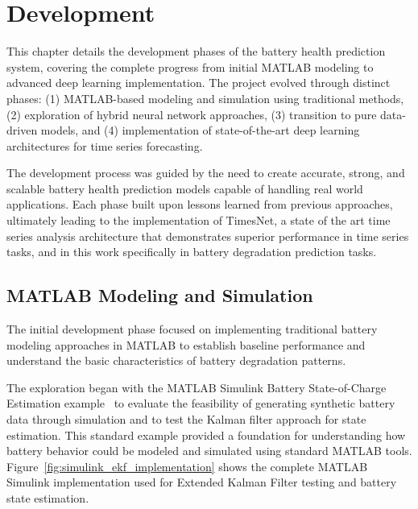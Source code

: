 \chapter{Development}
\label{ch:Development}

This chapter details the development phases of the battery health prediction system, covering the complete progress from initial MATLAB modeling to advanced deep learning implementation. The project evolved through distinct phases: (1) MATLAB-based modeling and simulation using traditional methods, (2) exploration of hybrid neural network approaches, (3) transition to pure data-driven models, and (4) implementation of state-of-the-art deep learning architectures for time series forecasting.

The development process was guided by the need to create accurate, strong, and scalable battery health prediction models capable of handling real world applications. Each phase built upon lessons learned from previous approaches, ultimately leading to the implementation of TimesNet, a state of the art time series analysis architecture that demonstrates superior performance in time series tasks, and in this work specifically in battery degradation prediction tasks.

\section{MATLAB Modeling and Simulation}
\label{sec:matlab_modeling}

The initial development phase focused on implementing traditional battery modeling approaches in MATLAB to establish baseline performance and understand the basic characteristics of battery degradation patterns.

The exploration began with the MATLAB Simulink Battery State-of-Charge Estimation example~\cite{mathworks_battery_soc_2024} to evaluate the feasibility of generating synthetic battery data through simulation and to test the Kalman filter approach for state estimation. This standard example provided a foundation for understanding how battery behavior could be modeled and simulated using standard MATLAB tools. Figure~\ref{fig:simulink_ekf_implementation} shows the complete MATLAB Simulink implementation used for Extended Kalman Filter testing and battery state estimation.

